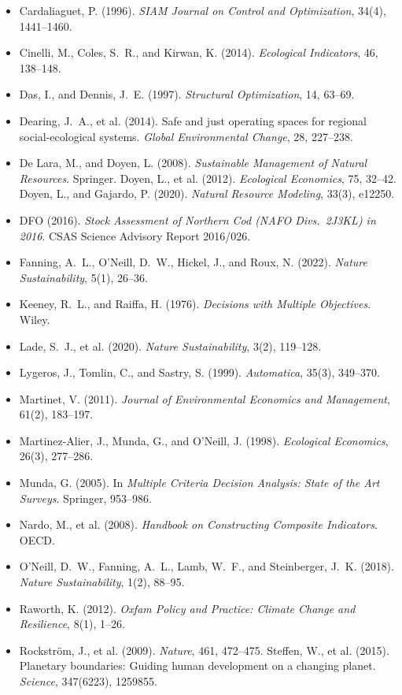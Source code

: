 \begin{itemize}[leftmargin=1.5em,itemsep=1pt]
\item Cardaliaguet, P. (1996). \emph{SIAM Journal on Control and Optimization}, 34(4), 1441--1460.
\item Cinelli, M., Coles, S.~R., and Kirwan, K. (2014). \emph{Ecological Indicators}, 46, 138--148.
\item Das, I., and Dennis, J.~E. (1997). \emph{Structural Optimization}, 14, 63--69.
\item Dearing, J.~A., et al. (2014). Safe and just operating spaces for regional social-ecological systems. \emph{Global Environmental Change}, 28, 227--238.
\item De Lara, M., and Doyen, L. (2008). \emph{Sustainable Management of Natural Resources}. Springer. Doyen, L., et al. (2012). \emph{Ecological Economics}, 75, 32--42. Doyen, L., and Gajardo, P. (2020). \emph{Natural Resource Modeling}, 33(3), e12250.
\item DFO (2016). \emph{Stock Assessment of Northern Cod (NAFO Divs.\ 2J3KL) in 2016}. CSAS Science Advisory Report 2016/026.
\item Fanning, A.~L., O'Neill, D.~W., Hickel, J., and Roux, N. (2022). \emph{Nature Sustainability}, 5(1), 26--36.
\item Keeney, R.~L., and Raiffa, H. (1976). \emph{Decisions with Multiple Objectives}. Wiley.
\item Lade, S.~J., et al. (2020). \emph{Nature Sustainability}, 3(2), 119--128.
\item Lygeros, J., Tomlin, C., and Sastry, S. (1999). \emph{Automatica}, 35(3), 349--370.
\item Martinet, V. (2011). \emph{Journal of Environmental Economics and Management}, 61(2), 183--197.
\item Martinez-Alier, J., Munda, G., and O'Neill, J. (1998). \emph{Ecological Economics}, 26(3), 277--286.
\item Munda, G. (2005). In \emph{Multiple Criteria Decision Analysis: State of the Art Surveys}. Springer, 953--986.
\item Nardo, M., et al. (2008). \emph{Handbook on Constructing Composite Indicators}. OECD.
\item O'Neill, D.~W., Fanning, A.~L., Lamb, W.~F., and Steinberger, J.~K. (2018). \emph{Nature Sustainability}, 1(2), 88--95.
\item Raworth, K. (2012). \emph{Oxfam Policy and Practice: Climate Change and Resilience}, 8(1), 1--26.
\item Rockstr\"om, J., et al. (2009). \emph{Nature}, 461, 472--475. Steffen, W., et al. (2015). Planetary boundaries: Guiding human development on a changing planet. \emph{Science}, 347(6223), 1259855.

\end{itemize}
